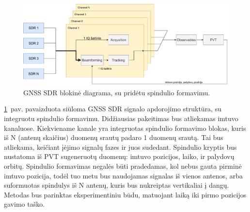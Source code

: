 \documentclass[main.tex]{subfiles}
\begin{document}
\begin{figure}[h]
    \begin{centering}
    \includegraphics[scale=0.5]{drawings/beamformer_sw_implementation}
    \par\end{centering}
    \protect\caption{\label{fig:sw_beamformer_block}GNSS SDR blokinė diagrama, su pridėtu spindulio formavimu.}
\end{figure}

\ref{fig:sw_beamformer_block}~pav. pavaizduota siūloma GNSS SDR signalo apdorojimo
struktūra,
su integruotu spindulio formavimu. Didžiausias pakeitimas bus atliekamas
imtuvo kanaluose. Kiekviename kanale yra integruotas spindulio formavimo
blokas, kuris iš N (antenų skaičius) duomenų srautų padaro 1 duomenų
srautą. Tai bus atliekama, keičiant įėjimo signalų fazes ir juos
sudedant. Spindulio kryptis bus nustatoma iš PVT sugeneruotų duomenų:
imtuvo pozicijos, laiko, ir palydovų orbitų.
Spindulio formavimas negalės būti pradedamas, kol nebus gauta pirminė
imtuvo pozicija, todėl tuo metu bus naudojamas signalas iš vienos antenos,
arba suformuotas spindulys iš N antenų, kuris bus nukreiptas vertikaliai į dangų.
Metodas bus parinktas eksperimentiniu būdu, matuojant laiką iki pirmo pozicijos
gavimo taško.
\end{document}

